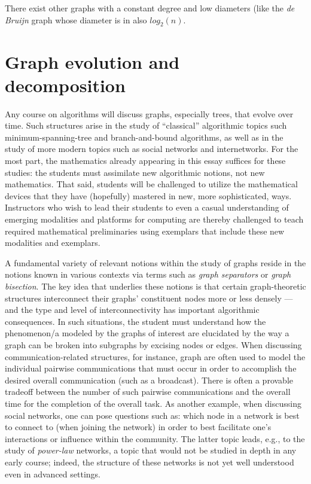 There exist other graphs with a constant degree and low diameters (like the {\it de Bruijn} graph whose diameter is in also $log_2(n)$. 





\section{Graph evolution and decomposition}

Any course on algorithms will discuss graphs, especially trees, that
evolve over time.  Such structures arise in the study of ``classical''
algorithmic topics such minimum-spanning-tree and branch-and-bound
algorithms, as well as in the study of more modern topics such as
social networks and internetworks.  For the most part, the mathematics
already appearing in this essay suffices for these studies: the students
must assimilate new algorithmic notions, not new mathematics.  That
said, students will be challenged to utilize the mathematical devices
that they have (hopefully) mastered in new, more sophisticated, ways.
Instructors who wish to lead their students to even a casual
understanding of emerging modalities and platforms for computing are
thereby challenged to teach required mathematical preliminaries using
exemplars that include these new modalities and exemplars.

A fundamental variety of relevant notions within the study of graphs
reside in the notions known in various contexts via terms such as {\em
  graph separators} or {\em graph bisection}.  The key idea that
underlies these notions is that certain graph-theoretic structures
interconnect their graphs' constituent nodes more or less densely ---
and the type and level of interconnectivity has important algorithmic
consequences.  In such situations, the student must understand how the
phenomenon/a modeled by the graphs of interest are elucidated by the
way a graph can be broken into subgraphs by excising nodes or edges.
When discussing communication-related structures, for instance, graph
are often used to model the individual pairwise communications that
must occur in order to accomplish the desired overall communication
(such as a broadcast).  There is often a provable tradeoff between the
number of such pairwise communications and the overall time for the
completion of the overall task.  As another example, when discussing
social networks, one can pose questions such as: which node in a
network is best to connect to (when joining the network) in order to
best facilitate one's interactions or influence within the community.
The latter topic leads, e.g., to the study of {\em power-law}
networks, a topic that would not be studied in depth in any early
course; indeed, the structure of these networks is not yet well
understood even in advanced settings.






